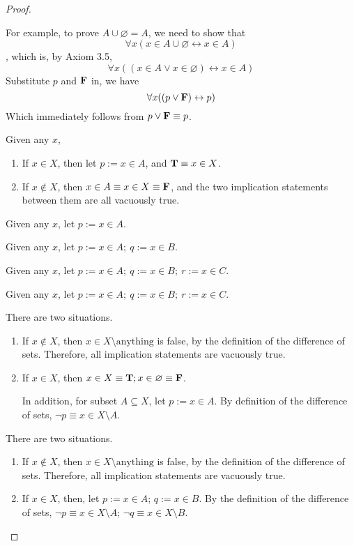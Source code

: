 \begin{proof}
\begin{enumabc}
		For example, to prove $A \cup \varnothing = A$, we need to show that
		\[
			\forall x(x \in A \cup \varnothing \leftrightarrow x \in A)
		\]
		, which is, by Axiom 3.5,
		\[
			\forall x((x \in A \vee x \in \varnothing) \leftrightarrow x \in A)
		\]
		Substitute $p$ and $\mathbf{F}$ in, we have
		\[
			\forall x((p \vee \mathbf{F}) \leftrightarrow p)
		\]
		Which immediately follows from $p \vee \mathbf{F} \equiv p$.
		
		\item Given any $x$, 
		\begin{enumerate}
			\item If $x \in X$, then let $p := x \in A$, and $\mathbf{T} \equiv x \in X$.
			\item If $x \notin X$, then $x \in A \equiv x \in X \equiv \mathbf{F}$, and the two implication statements between them are all vacuously true.
		\end{enumerate}
	
		\item Given any $x$, let $p := x \in A$.
		
		\item Given any $x$, let $p := x \in A;\ q := x \in B$.
		
		\item Given any $x$, let $p := x \in A;\ q := x \in B;\ r := x \in C$.
		
		\item Given any $x$, let $p := x \in A;\ q := x \in B;\ r := x \in C$.
		
		\item There are two situations.
		\begin{enumerate}
			\item If $x \notin X$, then $x \in X \setminus \text{anything}$ is false, by the definition of the difference of sets. Therefore, all implication statements are vacuously true.
			
			\item If $x \in X$, then $x \in X \equiv \mathbf{T}; x \in \varnothing \equiv \mathbf{F}$. 
			
			In addition, for subset $A \subseteq X$, let $p := x \in A$. By definition of the difference of sets, $\neg p \equiv x \in X \setminus A$.
		\end{enumerate}
	
			\item There are two situations.
			\begin{enumerate}
				\item If $x \notin X$, then $x \in X \setminus \text{anything}$ is false, by the definition of the difference of sets. Therefore, all implication statements are vacuously true.
				
				\item If $x \in X$, then, let $p := x \in A$; $q := x \in B$. By the definition of the difference of sets, $\neg p \equiv x \in X \setminus A$; $\neg q \equiv x \in X \setminus B$.
			\end{enumerate}
	\end{enumabc}
\end{proof}

